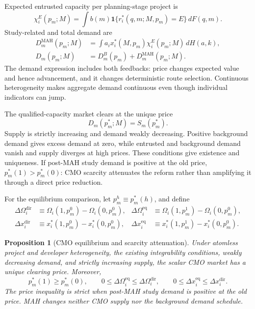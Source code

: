 \documentclass[12pt]{article}
\newtheorem{proposition}{Proposition}
\newcommand{\1}{\mathbf{1}}
\begin{document}
Expected entrusted capacity per planning-stage project is
\begin{equation}
  \chi_i^E(p_m;M)
  =
  \int b(m)\mathbf 1\{r_i^*(q,m;M,p_m)=E\}\,dF(q,m).
  \label{eq:p16m-project-demand}
\end{equation}
Study-related and total demand are
\begin{equation}
  \begin{aligned}
  D_m^{\mathrm{MAH}}(p_m;M)
  &=
  \int a_ix_i^*(M,p_m)\chi_i^E(p_m;M)\,dH(a,k),\\
  D_m(p_m;M)
  &=D_m^B(p_m)+D_m^{\mathrm{MAH}}(p_m;M).
  \end{aligned}
  \label{eq:p16m-demand}
\end{equation}
The demand expression includes both feedbacks: price changes expected value
and hence advancement, and it changes deterministic route selection.
Continuous heterogeneity makes aggregate demand continuous even though
individual indicators can jump.

The qualified-capacity market clears at the unique price
\begin{equation}
  D_m(p_m^*;M)=S_m(p_m^*).
  \label{eq:p16m-clearing}
\end{equation}
Supply is strictly increasing and demand weakly decreasing. Positive
background demand gives excess demand at zero, while entrusted and
background demand vanish and supply diverges at high prices. These conditions
give existence and uniqueness. If post-MAH study demand is positive at the
old price, \(p_m^*(1)>p_m^*(0)\): CMO scarcity attenuates the reform rather
than amplifying it through a direct price reduction.

For the equilibrium comparison, let \(p_m^h\equiv p_m^*(h)\), and define
\begin{align}
  \Delta\Omega_i^{\mathrm{dir}}
  &\equiv \Omega_i(1,p_m^0)-\Omega_i(0,p_m^0),
  &
  \Delta\Omega_i^{\mathrm{eq}}
  &\equiv \Omega_i(1,p_m^1)-\Omega_i(0,p_m^0),
  \label{eq:p16m-value-comparisons}\\
  \Delta x_i^{\mathrm{dir}}
  &\equiv x_i^*(1,p_m^0)-x_i^*(0,p_m^0),
  &
  \Delta x_i^{\mathrm{eq}}
  &\equiv x_i^*(1,p_m^1)-x_i^*(0,p_m^0).
  \label{eq:p16m-advancement-comparisons}
\end{align}

\begin{proposition}[CMO equilibrium and scarcity attenuation]
\label{prop:main-cmo}
Under atomless project and developer heterogeneity, the existing integrability
conditions, weakly decreasing demand, and strictly increasing supply, the
scalar CMO market has a unique clearing price. Moreover,
\begin{equation}
  p_m^*(1)\geq p_m^*(0),
  \qquad
  0\leq\Delta\Omega_i^{\mathrm{eq}}
  \leq\Delta\Omega_i^{\mathrm{dir}},
  \qquad
  0\leq\Delta x_i^{\mathrm{eq}}
  \leq\Delta x_i^{\mathrm{dir}}.
  \label{eq:p16m-scarcity-attenuation}
\end{equation}
The price inequality is strict when post-MAH study demand is positive at the
old price. MAH changes neither CMO supply nor the background demand schedule.
\end{proposition}
\end{document}
